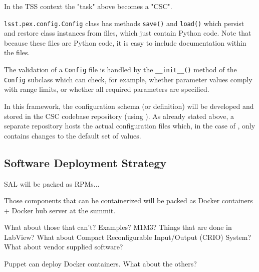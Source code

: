 In the TSS context the "task" above becomes a "CSC".

\texttt{lsst.pex.config.Config} class has methods \texttt{save()} and \texttt{load()} which persist and restore class instances from files, which just contain Python code. Note that because these files are Python code, it is easy to include documentation within the files.

The validation of a \texttt{Config} file is handled by the \texttt{\_\_init\_\_()} method of the \texttt{Config} subclass which can check, for example, whether parameter values comply with range limits, or whether all required parameters are specified.

In this framework, the configuration schema (or definition) will be developed and stored in the CSC codebase repository (using \pexC). As already stated above, a separate repository hosts the actual configuration files which, in the case of \pexC, only contains changes to the default set of values.



%


\subsection{Software Deployment Strategy}\label{sect:deploy}
SAL will be packed as RPMs...

Those components that can be containerized will be packed as Docker containers + Docker hub server at the summit.

What about those that can't? Examples? M1M3? Things that are done in LabView? What about Compact Reconfigurable Input/Output (CRIO) System? What about vendor supplied software?

Puppet can deploy Docker containers. What about the others?

